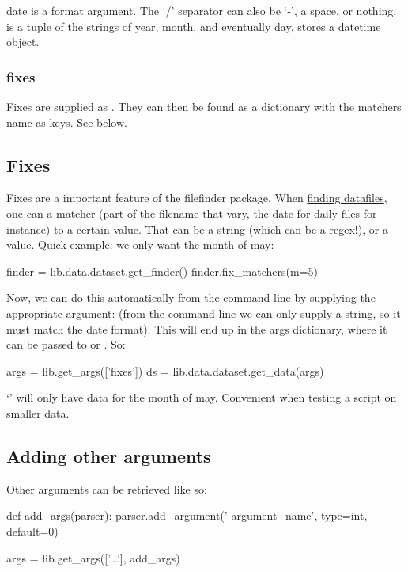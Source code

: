 date is a  format argument. The `/' separator can also be `-', a space, or nothing.
 is a tuple of the strings of year, month, and eventually day\@.  stores a datetime object.

\subsubsection{fixes}
Fixes are supplied as . They can then be found as a dictionary with the matchers name as keys. %
See  below.

\subsection{Fixes}
\label{sec:org-fixes}
Fixes are a important feature of the filefinder package.
When \hyperref[sec:org-preregex]{finding datafiles}, one can  a matcher (part of the filename that vary, the date for daily files for instance) to a certain value.
That can be a string (which can be a regex!), or a value. Quick example: we only want the month of may:
\begin{python}
finder = lib.data.dataset.get_finder()
finder.fix_matchers(m=5)
\end{python}

Now, we can do this automatically from the command line by supplying the appropriate argument:  (from the command line we can only supply a string, so it must match the date format). This will end up in the args dictionary, where it can be passed to  or . So:
\begin{python}
args = lib.get_args(['fixes'])
ds = lib.data.dataset.get_data(args)
\end{python}
`' will only have data for the month of may. Convenient when testing a script on smaller data.

\subsection{Adding other arguments}
Other arguments can be retrieved like so:
\begin{python}
def add_args(parser):
    parser.add_argument('-argument_name', type=int, default=0)

args = lib.get_args(['...'], add_args)
\end{python}

